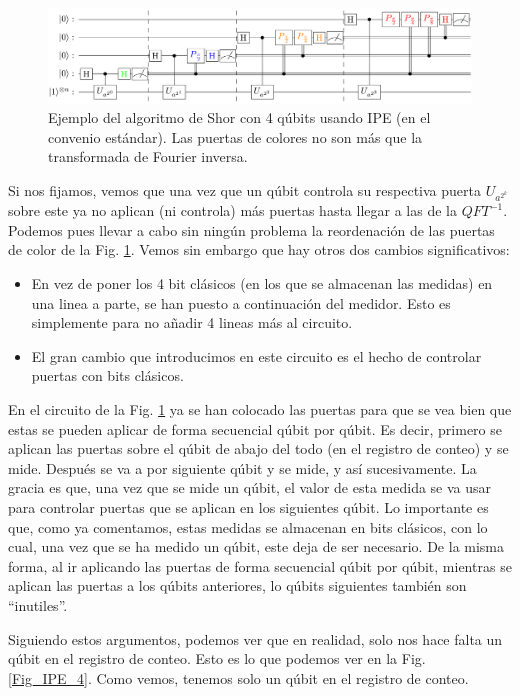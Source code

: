 \documentclass[a4paper,11pt]{book} %
\numberwithin{equation}{chapter}
\begin{document}
\begin{figure}[t]
\centering
\includegraphics[width=1\linewidth]{Figuras/Fig_IPE_3.png}
\caption{Ejemplo del algoritmo de Shor con 4 qúbits usando IPE (en el convenio estándar). Las puertas de colores no son más que la transformada de Fourier inversa. }
\label{Fig_IPE_3}
\end{figure}

Si nos fijamos, vemos que una vez que un qúbit controla su respectiva puerta $U_{a^{2^k}}$ sobre este ya no aplican (ni controla) más puertas hasta llegar a las de la $QFT^{-1}$.  Podemos pues llevar a cabo sin ningún problema la reordenación de las puertas de color de la Fig. \ref{Fig_IPE_3}. Vemos sin embargo que hay otros dos cambios significativos:
\begin{itemize}
	\item En vez de poner los 4 bit clásicos (en los que se almacenan las medidas) en una linea a parte, se han puesto a continuación del medidor. Esto es simplemente para no añadir 4 lineas más al circuito.
	\item El gran cambio que introducimos en este circuito es el hecho de controlar puertas con bits clásicos. 
\end{itemize}

En el circuito de la Fig. \ref{Fig_IPE_3} ya se han colocado las puertas para que se vea bien que estas se pueden aplicar de forma secuencial qúbit por qúbit. Es decir, primero se aplican las puertas sobre el qúbit de abajo del todo (en el registro de conteo) y se mide. Después se va a por siguiente qúbit y se mide, y así sucesivamente. La gracia es que, una vez que se mide un qúbit, el valor de esta medida se va usar para controlar puertas que se aplican en los siguientes qúbit. Lo importante es que, como ya comentamos, estas medidas se almacenan en bits clásicos, con lo cual, una vez que se ha medido un qúbit, este deja de ser necesario. De la misma forma, al ir aplicando las puertas de forma secuencial qúbit por qúbit, mientras se aplican las puertas a los qúbits anteriores, lo qúbits siguientes también son ``inutiles''. 

Siguiendo estos argumentos, podemos ver que en realidad, solo nos hace falta un qúbit en el registro de conteo. Esto es lo que podemos ver en la Fig. \ref{Fig_IPE_4}. Como vemos, tenemos solo un qúbit en el registro de conteo. 
\end{document}

